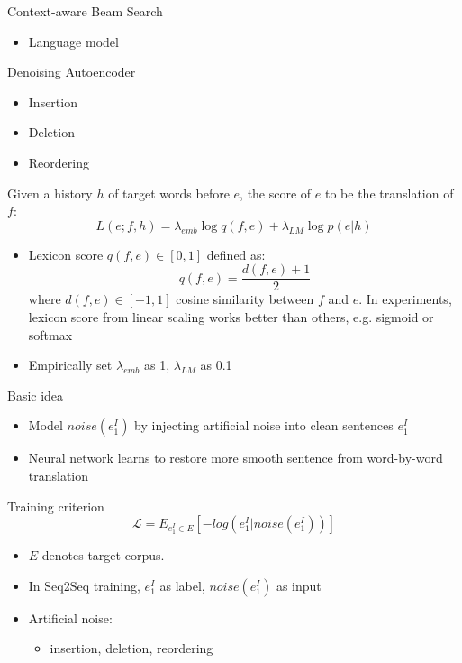 \documentclass[11pt, a4paper, landscape]{article}
\begin{document}
	\NewPage
	\vfill
	Context-aware Beam Search
	\begin{itemize}
		\item Language model\\
	\end{itemize}
	Denoising Autoencoder
	\begin{itemize}
		\item Insertion
		\item Deletion
		\item Reordering
	\end{itemize}	
	\vfill
		
	\NewPage
	
	\vfill
	Given a history $h$ of target words before $e$, the score of $e$ to be the translation of $f$:
	\[ L(e;f,h)=\lambda_{emb}\log q(f,e) + \lambda_{LM} \log p(e|h)\]	
	\begin{itemize}
		\item Lexicon score $q(f,e) \in [0,1] $ defined as:
		\[ q(f,e)= \frac{d(f,e)+1}{2}\]
		where $d(f,e)\in [-1,1]$ cosine similarity between $f$ and $e$. In experiments, lexicon score from linear scaling works better than others, e.g. sigmoid or softmax
		\item Empirically set ${\lambda_{emb}}$  as 1, ${\lambda_{LM}}$ as 0.1
	\end{itemize}	
	\vfill
	
\NewPage
{}	
\vfill
	Basic idea
	\begin{itemize}
		\item Model ${noise}(e_1^I)$ by injecting artificial noise into clean sentences $e_1^I$
		\item Neural network learns to restore more smooth sentence from word-by-word translation\\
	\end{itemize}
	 Training criterion
	\[ \mathcal{L} = E_{e_1^I \in E}[-log(e_1^I|noise(e_1^I))]\]
	\begin{itemize}
		\item $E$ denotes target corpus.
		\item In Seq2Seq training, $e_1^I$ as label, $noise(e_1^I)$  as input 
		\item Artificial noise:
		\begin{itemize}
			\item insertion, deletion, reordering
		\end{itemize} 
	\end{itemize}
\end{document}
